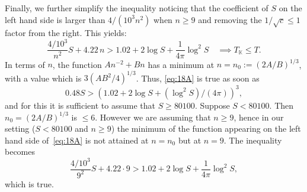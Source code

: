 \documentclass[a4paper,11pt]{amsart}
\newcommand{\field}[1]{\mathbb{{#1}}}
\newcommand{\K}{\field{{K}}}
\theoremstyle{remark}
\begin{document}
Finally, we further simplify the inequality noticing that the coefficient of $S$ on the left hand side is
larger than $4/(10^3 n^2)$ when $n\geq 9$ and removing the $1/\sqrt{c}\leq 1$ factor from the right.
%
%
This yields:
\begin{equation}\label{eq:18A}
\frac{4/10^3}{n^2} S + 4.22\,n
> 1.02 + 2\log S + \frac{1}{4\pi}\log^2S
\quad
\implies T_\K \leq T.
\end{equation}
%
%
In terms of $n$, the function $An^{-2}+Bn$ has a minimum at $n = n_0 := (2A/B)^{1/3}$, with a value
which is $3(AB^2/4)^{1/3}$. Thus, \eqref{eq:18A} is true as soon as
\[
0.48 S > (1.02 + 2\log S + (\log^2S)/(4\pi))^3,
\]
%
and for this it is sufficient to assume that $S \geq 80100$.
%
Suppose $S < 80100$. Then $n_0 = (2A/B)^{1/3}$ is $\leq 6$.
However we are assuming that $n\geq 9$, hence in our setting ($S < 80100$ and $n\geq 9$) the minimum of
the function appearing on the left hand side of~\eqref{eq:18A} is not attained at $n=n_0$ but at $n=9$.
The inequality becomes
\[
\frac{4/10^3}{9^2} S + 4.22\cdot 9
> 1.02 + 2\log S + \frac{1}{4\pi}\log^2S,
\]
which is true.
\end{document}
